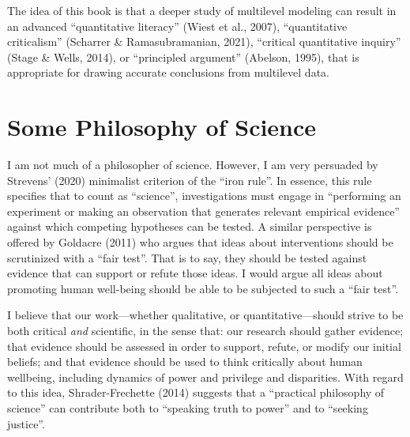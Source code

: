\documentclass[
  letterpaper,
  DIV=11,
  numbers=noendperiod]{scrreprt}
\begin{document}
The idea of this book is that a deeper study of multilevel modeling can
result in an advanced ``quantitative literacy'' (Wiest et al., 2007),
 ``quantitative criticalism'' (Scharrer \&
Ramasubramanian, 2021),  ``critical
quantitative inquiry'' (Stage \& Wells, 2014),
 or ``principled argument''
(Abelson, 1995),  that is appropriate for
drawing accurate conclusions from multilevel data.

\section{Some Philosophy of Science}\label{sec-science}

I am not much of a philosopher of science. 
However, I am very persuaded by Strevens' (2020) minimalist criterion of
the ``iron rule''. In essence, this rule specifies that to count as
``science'', investigations must engage in ``performing an experiment or
making an observation that generates relevant empirical evidence''
against which competing hypotheses can be tested. A similar perspective
is offered by Goldacre (2011) who argues that ideas about interventions
should be scrutinized with a ``fair test''. That is to say, they should
be tested against evidence that can support or refute those ideas. I
would argue all ideas about promoting human well-being should be able to
be subjected to such a ``fair test''.

I believe that our work---whether qualitative, or quantitative---should
strive to be both critical \emph{and} scientific, in the sense that: our
research should gather evidence; that evidence should be assessed in
order to support, refute, or modify our initial beliefs; and that
evidence should be used to think critically about human wellbeing,
including dynamics of power and privilege and disparities. With regard
to this idea, Shrader-Frechette (2014) suggests that a ``practical
philosophy of science'' can contribute both to ``speaking truth to
power'' and to ``seeking justice''.
\end{document}
